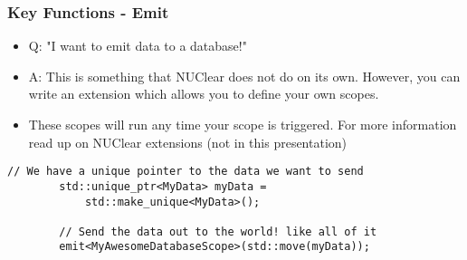 \documentclass{beamer}
\begin{document}
\begin{frame}[fragile]
	\frametitle{Key Functions - Emit}
	\begin{itemize}
		\item Q: "I want to emit data to a database!"
		\item A: This is something that NUClear does not do on its own. However, you can write an extension which allows you to define your own scopes.
		\item These scopes will run any time your scope is triggered. For more information read up on NUClear extensions (not in this presentation)
	\end{itemize}

	\begin{lstlisting}[language=nuclear]
		// We have a unique pointer to the data we want to send
		std::unique_ptr<MyData> myData = 
		    std::make_unique<MyData>();
		
		// Send the data out to the world! like all of it
		emit<MyAwesomeDatabaseScope>(std::move(myData));
	\end{lstlisting}
\end{frame}
\end{document}
